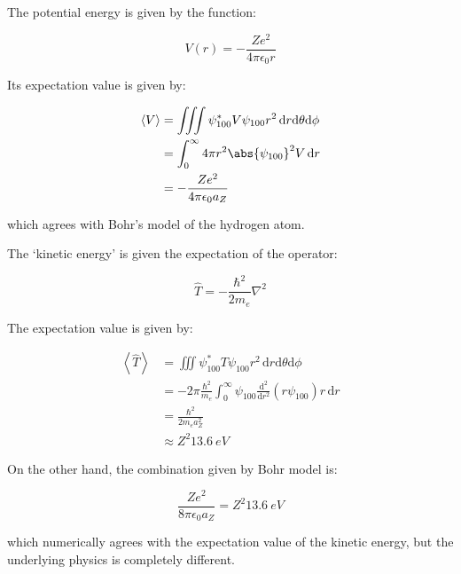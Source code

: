 \documentclass[12pt]{article}
\begin{document}
The potential energy is given by the function:

\begin{equation}
    V(r) = - \frac{Ze^{2}}{4 \pi \epsilon_{0} r}
\end{equation}

Its expectation value is given by:

\begin{equation}
    \begin{split}
        \left\langle V \right\rangle &= \iiint \psi_{100}^{*} V \psi_{100} r^{2} \, \mathrm{d}r \mathrm{d}\theta \mathrm{d}\phi \\
        &= \int_{0}^{\infty} 4 \pi r^{2} \abs{\psi_{100}}^{2} V \, \mathrm{d}r \\
        &= - \frac{Ze^{2}}{4 \pi \epsilon_{0} a_{Z}}
    \end{split}
\end{equation}

which agrees with Bohr's model of the hydrogen atom.

The `kinetic energy' is given the expectation of the operator:

\begin{equation}
    \hat{T} = - \frac{\hbar^{2}}{2m_{e}} \nabla^{2}
\end{equation}

The expectation value is given by:

\begin{equation}
    \begin{split}
        \left\langle \hat{T} \right\rangle &= \iiint \psi_{100}^{*} T \psi_{100} r^{2} \, \mathrm{d}r \mathrm{d}\theta \mathrm{d}\phi \\
        &= - 2\pi \frac{\hbar^{2}}{m_{e}} \int_{0}^{\infty} \psi_{100} \frac{\mathrm{d}^{2}}{\mathrm{d}r^{2}} \left( r\psi_{100} \right) r \, \mathrm{d}r \\
        &= \frac{\hbar^{2}}{2m_{e} a_{Z}^{2}} \\
        &\approx Z^{2} \qty{13.6}{eV}
    \end{split}
\end{equation}

On the other hand, the combination given by Bohr model is:

\begin{equation}
    \frac{Ze^{2}}{8 \pi \epsilon_{0} a_{Z}} = Z^{2} \qty{13.6}{eV}
\end{equation}

which numerically agrees with the expectation value of the kinetic energy, but the underlying physics is completely different.
\end{document}
